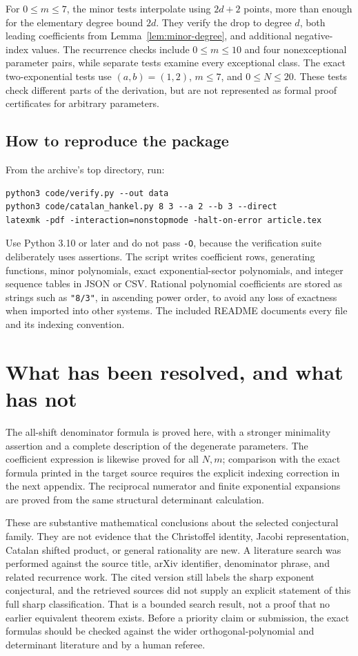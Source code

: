 \documentclass[11pt,a4paper]{article}
\numberwithin{equation}{section}
\theoremstyle{definition}
\theoremstyle{remark}
\begin{document}
For $0\leq m\leq7$, the minor tests interpolate using $2d+2$ points,
more than enough for the elementary degree bound $2d$.  They verify
the drop to degree $d$, both leading coefficients from
Lemma~\ref{lem:minor-degree}, and additional negative-index values.
The recurrence checks include $0\leq m\leq10$ and four nonexceptional
parameter pairs, while separate tests examine every exceptional class.
The exact two-exponential tests use $(a,b)=(1,2)$, $m\leq7$, and
$0\leq N\leq20$.  These tests check different parts of the derivation,
but are not represented as formal proof certificates for arbitrary
parameters.

\subsection{How to reproduce the package}
From the archive's top directory, run:
\begin{lstlisting}
python3 code/verify.py --out data
python3 code/catalan_hankel.py 8 3 --a 2 --b 3 --direct
latexmk -pdf -interaction=nonstopmode -halt-on-error article.tex
\end{lstlisting}
Use Python 3.10 or later and do not pass \texttt{-O}, because the
verification suite deliberately uses assertions.  The script writes
coefficient rows, generating functions, minor polynomials, exact
exponential-sector polynomials, and integer sequence tables in JSON or
CSV.  Rational polynomial coefficients are stored as strings such as
\texttt{"8/3"}, in ascending power order, to avoid any loss of exactness
when imported into other systems.  The included README documents every
file and its indexing convention.

\section{What has been resolved, and what has not}\label{sec:status}

The all-shift denominator formula is proved here, with a stronger
minimality assertion and a complete description of the degenerate
parameters.  The coefficient expression is likewise proved for all
$N,m$; comparison with the exact formula printed in the target source
requires the explicit indexing correction in the next appendix.
The reciprocal numerator and finite exponential expansions are proved
from the same structural determinant calculation.

These are substantive mathematical conclusions about the selected
conjectural family.  They are not evidence that the Christoffel identity,
Jacobi representation, Catalan shifted product, or general rationality
are new.  A literature search was performed against the source title,
arXiv identifier, denominator phrase, and related recurrence work.
The cited version still labels the sharp exponent conjectural, and the
retrieved sources did not supply an explicit statement of this full
sharp classification.  That is a bounded search result, not a proof
that no earlier equivalent theorem exists.  Before a priority claim
or submission, the exact formulas should be checked against the wider
orthogonal-polynomial and determinant literature and by a human referee.
\end{document}

